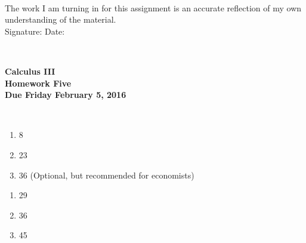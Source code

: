 \documentclass[12pt]{article}
\begin{document}
\\

\bigskip
\bigskip
\bigskip
\bigskip
\bigskip
\bigskip
\noindent The work I am turning in for this assignment is an accurate
reflection of my own understanding of the material.\\[14pt]

\noindent Signature: \underline{\hspace{7cm}} \hspace{1cm} Date:
\underline{\hspace{5cm}} 


\hspace{2mm}\\
\newpage

\thispagestyle{empty}
 
\begin{center}
{\large {\bf Calculus III}}\\
\medskip
{\large {\bf Homework Five}}\\
\medskip
{ {\bf Due Friday February 5, 2016}}\\
\end{center}

\hspace{2mm}\\




\begin{enumerate}
\setlength{\itemsep}{-1mm}
  \item 8
  \item 23
  \item 36 (Optional, but recommended for economists)
\end{enumerate}



\begin{enumerate}
\setlength{\itemsep}{-1mm}
  \item 29
  \item 36
  \item 45
\end{enumerate}
\end{document}
